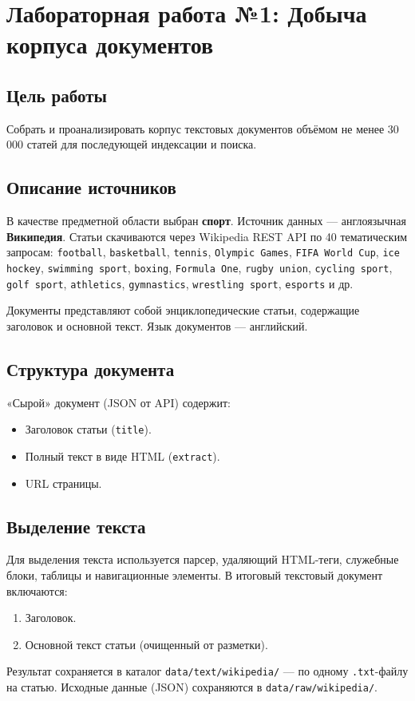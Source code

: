 \documentclass[a4paper,12pt]{article}
\begin{document}
\section{Лабораторная работа №1: Добыча корпуса документов}

\subsection{Цель работы}
Собрать и проанализировать корпус текстовых документов объёмом не менее 30\,000 статей для последующей индексации и поиска.

\subsection{Описание источников}
В качестве предметной области выбран \textbf{спорт}. Источник данных — англоязычная \textbf{Википедия}. Статьи скачиваются через Wikipedia REST API по 40 тематическим запросам:
\texttt{football}, \texttt{basketball}, \texttt{tennis}, \texttt{Olympic Games}, \texttt{FIFA World Cup}, \texttt{ice hockey}, \texttt{swimming sport}, \texttt{boxing}, \texttt{Formula One}, \texttt{rugby union}, \texttt{cycling sport}, \texttt{golf sport}, \texttt{athletics}, \texttt{gymnastics}, \texttt{wrestling sport}, \texttt{esports} и др.

Документы представляют собой энциклопедические статьи, содержащие заголовок и основной текст. Язык документов — английский.

\subsection{Структура документа}
«Сырой» документ (JSON от API) содержит:
\begin{itemize}
    \item Заголовок статьи (\texttt{title}).
    \item Полный текст в виде HTML (\texttt{extract}).
    \item URL страницы.
\end{itemize}

\subsection{Выделение текста}
Для выделения текста используется парсер, удаляющий HTML-теги, служебные блоки, таблицы и навигационные элементы. В итоговый текстовый документ включаются:
\begin{enumerate}
    \item Заголовок.
    \item Основной текст статьи (очищенный от разметки).
\end{enumerate}
Результат сохраняется в каталог \texttt{data/text/wikipedia/} — по одному \texttt{.txt}-файлу на статью. Исходные данные (JSON) сохраняются в \texttt{data/raw/wikipedia/}.
\end{document}
